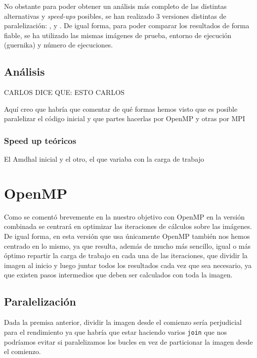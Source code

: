 \documentclass[12pt]{report} %
\begin{document}
No obstante para poder obtener un análisis más completo de las distintas alternativas y \textit{speed-ups} posibles, se han realizado 3 versiones distintas de paralelización: ,  y . De igual forma, para poder comparar los resultados de forma fiable, se ha utilizado las mismas imágenes de prueba, entorno de ejecución (guernika) y número de ejecuciones.

\section{Análisis}

CARLOS DICE QUE: ESTO CARLOS

Aquí creo que habría que comentar de qué formas hemos visto que es posible paralelizar el código inicial y que partes hacerlas por OpenMP y otras por MPI

\subsection{Speed up teóricos}

El Amdhal inicial y el otro, el que variaba con la carga de trabajo


\chapter{OpenMP}
\label{chap:OpenMP}

Como se comentó brevemente en la  nuestro objetivo con OpenMP en la versión combinada se centrará en optimizar las iteraciones de cálculos sobre las imágenes. De igual forma, en esta versión que usa únicamente OpenMP también nos hemos centrado en lo mismo, ya que resulta, además de mucho más sencillo, igual o más óptimo repartir la carga de trabajo en cada una de las iteraciones, que dividir la imagen al inicio y luego juntar todos los resultados cada vez que sea necesario, ya que existen pasos intermedios que deben ser calculados con toda la imagen.


\section{Paralelización}

Dada la premisa anterior, dividir la imagen desde el comienzo sería perjudicial para el rendimiento ya que habría que estar haciendo varios \texttt{join} que nos podríamos evitar si paralelizamos los bucles en vez de particionar la imagen desde el comienzo.
\end{document}
